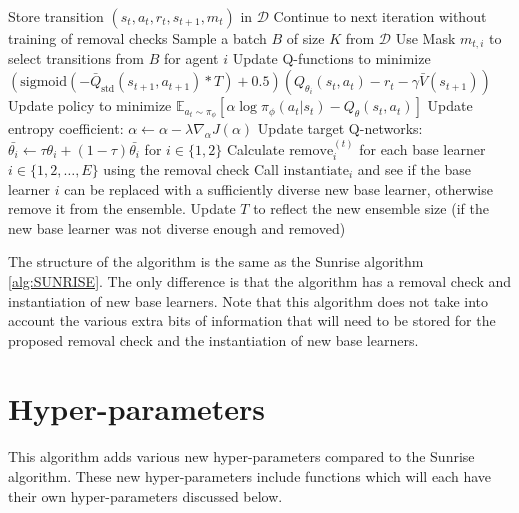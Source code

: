 \begin{algorithm}
\begin{algorithmic}[1]
        \State Store transition $(s_{t}, a_{t}, r_{t}, s_{t+1}, m_t)$ in $\mathcal{D}$
    \EndFor
        \State Continue to next iteration without training of removal checks
    \EndIf
        \State Sample a batch $B$ of size $K$ from $\mathcal{D}$
            \State Use Mask $m_{t,i}$ to select transitions from $B$ for agent $i$
            \State Update Q-functions to minimize $(\text{sigmoid}(-\bar{Q}_{\text{std}}(s_{t+1}, a_{t+1})*T)+0.5)(Q_{\theta_i}(s_t, a_t)-r_t-\gamma \bar{V}(s_{t+1}))$
            \State Update policy to minimize $\mathbb{E}_{a_t \sim \pi_\phi}\left[ \alpha \log \pi_\phi (a_t|s_t) - Q_\theta(s_t, a_t)\right]$
            \State Update entropy coefficient: $\alpha \gets \alpha - \lambda \hat{\nabla}_{\alpha} J(\alpha)$
            \State Update target Q-networks: $\bar{\theta_{i}} \gets \tau\theta_{i} + (1 - \tau) \bar{\theta_{i}}$ for $i \in \{1,2\}$
        \EndFor
    \EndFor
        \State Calculate $\text{remove}_i^{(t)}$ for each base learner $i \in \{1,2,\ldots,E\}$ using the removal check
            \State Call $\text{instantiate}_i$ and see if the base learner $i$ can be replaced with a sufficiently diverse new base learner, otherwise remove it from the ensemble.
        \EndFor
        \State Update $T$ to reflect the new ensemble size (if the new base learner was not diverse enough and removed)
    \EndIf
{}

\end{algorithmic}
\end{algorithm}

The structure of the algorithm is the same as the Sunrise algorithm \ref{alg:SUNRISE}. The only difference is that the algorithm has a removal check and instantiation of new base learners. Note that this algorithm does not take into account the various extra bits of information that will need to be stored for the proposed removal check and the instantiation of new base learners.

\section{Hyper-parameters}
\label{sec:hyperparameters}

This algorithm adds various new hyper-parameters compared to the Sunrise algorithm. These new hyper-parameters include functions which will each have their own hyper-parameters discussed below.

